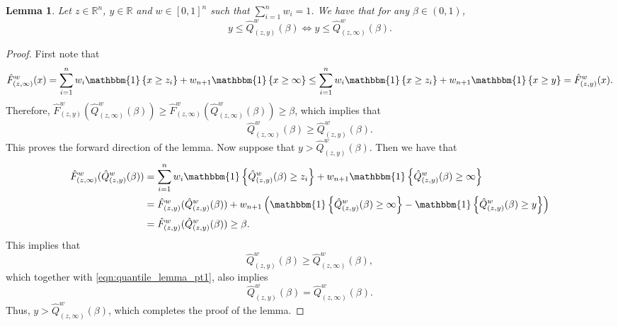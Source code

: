 \documentclass[11pt, titlepage]{article} %
\newcommand{\R}{\mathrm}
\newcommand{\Ind}[1]{\mathbbm{1}\left\{ #1 \right\}}
\numberwithin{equation}{section}
\newtheorem{lemma}{Lemma}
\theoremstyle{definition}
\newtheorem{remark}{Remark}
\numberwithin{theorem}{section}
\numberwithin{lemma}{section}
\numberwithin{corollary}{section}
\numberwithin{proposition}{section}
\numberwithin{definition}{section}
\numberwithin{remark}{section}
\begin{document}

\begin{lemma}
    Let \(z \in \mathbb{R}^n\), \(y \in \mathbb{R}\) and \(w \in [0,1]^n\) such that \(\sum_{i=1}^n w_i = 1\). We have that for any \(\beta \in (0,1)\), \[y \leq \hat{Q}^w_{(z,y)}(\beta) \iff y \leq \hat{Q}^w_{(z,\infty)}(\beta).\]
\label{lemma:quantile_lemma}
\end{lemma}
\begin{proof}
    First note that \[
        \hat{F}^w_{(z,\infty)}(x) = \sum_{i=1}^n w_i \Ind{x \geq z_i} + w_{n+1} \Ind{x \geq \infty} \leq \sum_{i=1}^n w_i \Ind{x \geq z_i} + w_{n+1} \Ind{x \geq y} = \hat{F}^w_{(z,y)}(x).
    \] Therefore, \(\hat{F}^w_{(z,y)}(\hat{Q}^w_{(z, \infty)}(\beta)) \geq \hat{F}^w_{(z,\infty)}(\hat{Q}^w_{(z, \infty)}(\beta)) \geq \beta\), which implies that \begin{equation}
        \hat{Q}^w_{(z, \infty)}(\beta) \geq \hat{Q}^w_{(z, y)}(\beta).
    \label{eqn:quantile_lemma_pt1}
    \end{equation} This proves the forward direction of the lemma. Now suppose that \(y > \hat{Q}^w_{(z,y)}(\beta).\) Then we have that \begin{align*}
        \hat{F}^w_{(z,\infty)}(\hat{Q}^w_{(z, y)}(\beta)) &= \sum_{i=1}^n w_i \Ind{\hat{Q}^w_{(z, y)}(\beta) \geq z_i} + w_{n+1} \Ind{\hat{Q}^w_{(z, y)}(\beta) \geq \infty} \\
        &= \hat{F}^w_{(z,y)}(\hat{Q}^w_{(z, y)}(\beta)) + w_{n+1} \left( \Ind{\hat{Q}^w_{(z, y)}(\beta) \geq \infty} - \Ind{\hat{Q}^w_{(z, y)}(\beta) \geq y} \right) \\
        &= \hat{F}^w_{(z,y)}(\hat{Q}^w_{(z, y)}(\beta)) \geq \beta.
    \end{align*} This implies that \[\hat{Q}^w_{(z, y)}(\beta) \geq \hat{Q}^w_{(z, \infty)}(\beta),\] which together with \eqref{eqn:quantile_lemma_pt1}, also implies \[\hat{Q}^w_{(z, y)}(\beta) = \hat{Q}^w_{(z, \infty)}(\beta).\] Thus, \(y > \hat{Q}^w_{(z, \infty)}(\beta)\), which completes the proof of the lemma.
\end{proof}
\end{document}
